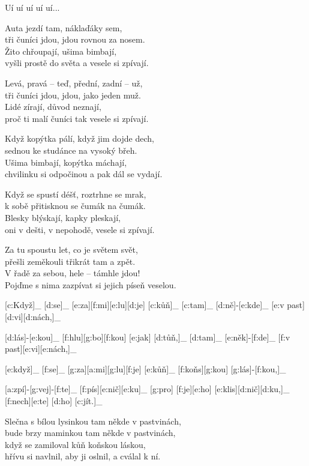 Uí uí uí uí uí...

\vfill\eject

Auta jezdí tam, náklaďáky sem, \\
tři čuníci jdou, jdou rovnou za nosem. \\
Žito chřoupají, ušima bimbají, \\
vyšli prostě do světa a vesele si zpívají.

Levá, pravá -- teď, přední, zadní -- už, \\
tři čuníci jdou, jdou, jako jeden muž. \\
Lidé zírají, důvod neznají, \\
proč ti malí čuníci tak vesele si zpívají.

Když kopýtka pálí, když jim dojde dech, \\
sednou ke studánce na vysoký břeh. \\
Ušima bimbají, kopýtka máchají, \\
chvilinku si odpočinou a pak dál se vydají.

Když se spustí déšť, roztrhne se mrak, \\
k sobě přitisknou se čumák na čumák. \\
Blesky blýskají, kapky pleskají, \\
oni v dešti, v nepohodě, vesele si zpívají.

Za tu spoustu let, co je světem svět, \\
přešli zeměkouli třikrát tam a zpět. \\
V řadě za sebou, hele -- támhle jdou! \\
Pojďme s nima zazpívat si jejich píseň veselou.




[c:Když]_ [d:se]_ [e:za][f:mi][e:lu][d:je] [c:kůň]_
[c:tam]_ [d:ně]-[e:kde]_ [e:v past][d:vi][d:nách,]_

[d:lás]-[e:kou]_ [f:hlu][g:bo][f:kou] [e:jak] [d:tůň,]_
[d:tam]_ [e:něk]-[f:de]_ [f:v past][e:vi][e:nách,]_

[e:když]_ [f:se]_ [g:za][a:mi][g:lu][f:je] [e:kůň]_
[f:koňs][g:kou] [g:lás]-[f:kou,]_

[a:zpí]-[g:vej]-[f:te]_ [f:pís][e:nič][e:ku]_
[g:pro] [f:je][e:ho] [e:klis][d:nič][d:ku,]_
[f:nech][e:te] [d:ho] [c:jít.]_

Slečna s bílou lysinkou
tam někde v pastvinách, \\
bude brzy maminkou
tam někde v pastvinách, \\
když se zamiloval kůň
koňskou láskou,\\
hřívu si navlnil, aby ji oslnil,
a cválal k ní.


